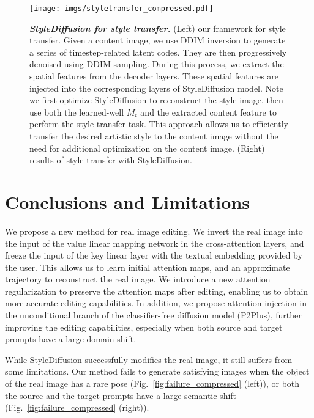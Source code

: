 \documentclass[twocolumn]{svjour3}          \smartqed  \usepackage{graphicx}
\begin{document}
\begin{figure*}[t]
\centering
\texttt{[image: imgs/styletransfer\_compressed.pdf]}
        \vspace{-2mm}
        \caption{\textit{\textbf{StyleDiffusion for style transfer.}} (Left) our framework for style transfer. Given a content image, we use DDIM inversion to generate a series of timestep-related latent codes. They are then progressively denoised using DDIM sampling. During this
process, we extract the spatial features from the decoder layers. These  spatial features are injected into the corresponding layers of StyleDiffusion model. Note we first optimize StyleDiffusion to reconstruct the style image, then use both the learned-well $M_t$ and the extracted content feature to perform the style transfer task.  
This approach allows us to efficiently transfer the desired artistic style to the content image without the need for additional optimization on the content image. (Right) results of style transfer with StyleDiffusion.
        \vspace{2mm}}
    \label{fig:styletransfer}
\end{figure*}


\section{Conclusions and Limitations} 
We propose a new method for real image editing.  We invert the real image into the input of the value linear mapping network in the cross-attention layers, and freeze the input of the key linear  layer with the textual embedding provided by the user. This allows us to learn initial attention maps, and an approximate trajectory to reconstruct the real image.  We introduce a new attention regularization to preserve the attention maps after editing, enabling us to obtain more accurate editing capabilities. In addition, we propose attention injection in the unconditional branch of the classifier-free diffusion model (P2Plus), further improving the editing capabilities, especially when both source and target prompts have a large domain shift. 

While StyleDiffusion successfully modifies the real image, it still suffers from some limitations.  Our method fails to generate satisfying images when the object of the real image has a rare pose (Fig.~\ref{fig:failure_compressed} (left)), or both the source and the target prompts have a large semantic shift (Fig.~\ref{fig:failure_compressed} (right)).


      
\end{document}
